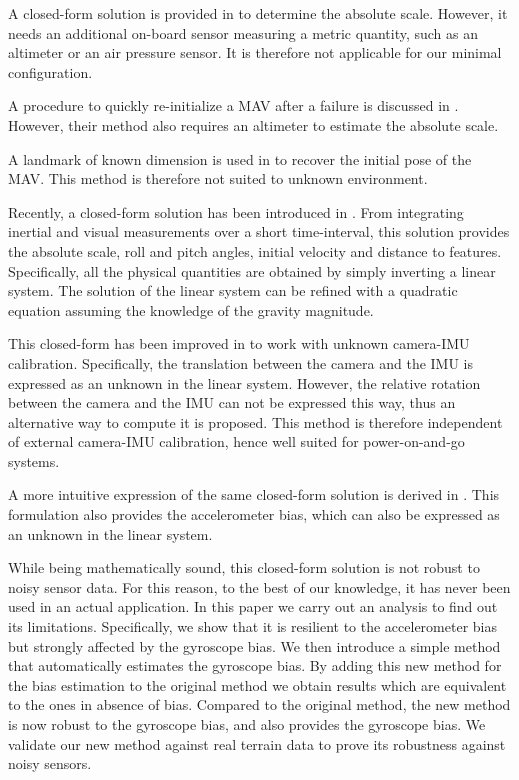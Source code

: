 \documentclass[letterpaper, 10 pt, conference]{ieeeconf}  %
\begin{document}


A closed-form solution is provided in \cite{Engel2013} to determine the absolute scale.
However, it needs an additional on-board sensor measuring a metric quantity, such as an altimeter or an air pressure sensor.
It is therefore not applicable for our minimal configuration.

A procedure to quickly re-initialize a MAV after a failure is discussed in \cite{Faessler2015}.
However, their method also requires an altimeter to estimate the absolute scale.

A landmark of known dimension is used in \cite{Gemeiner2007} to recover the initial pose of the MAV.
This method is therefore not suited to unknown environment.

Recently, a closed-form solution has been introduced in \cite{Martinelli2012}.
From integrating inertial and visual measurements over a short time-interval, this solution provides the absolute scale, roll and pitch angles, initial velocity and distance to features.
Specifically, all the physical quantities are obtained by simply inverting a linear system.
The solution of the linear system can be refined with a quadratic equation assuming the knowledge of the gravity magnitude.

This closed-form has been improved in \cite{Li2013} to work with unknown camera-IMU calibration.
Specifically, the translation between the camera and the IMU is expressed as an unknown in the linear system.
However, the relative rotation between the camera and the IMU can not be expressed this way,
thus an alternative way to compute it is proposed.
This method is therefore independent of external camera-IMU calibration, hence well suited for power-on-and-go systems.

A more intuitive expression of the same closed-form solution is derived in \cite{Martinelli2014}.
This formulation also provides the accelerometer bias, which can also be expressed as an unknown in the linear system.

While being mathematically sound, this closed-form solution is not robust to noisy sensor data.
For this reason, to the best of our knowledge, it has never been used in an actual application.
In this paper we carry out an analysis to find out its limitations.
Specifically, we show that it is resilient to the accelerometer bias but strongly affected by the gyroscope bias.
We then introduce a simple method that automatically estimates the gyroscope bias.
By adding this new method for the bias estimation to the original method we obtain results which are equivalent to the ones in absence of bias.
Compared to the original method, the new method is now robust to the gyroscope bias, and also provides the gyroscope bias.
We validate our new method against real terrain data to prove its robustness against noisy sensors.
\end{document}

